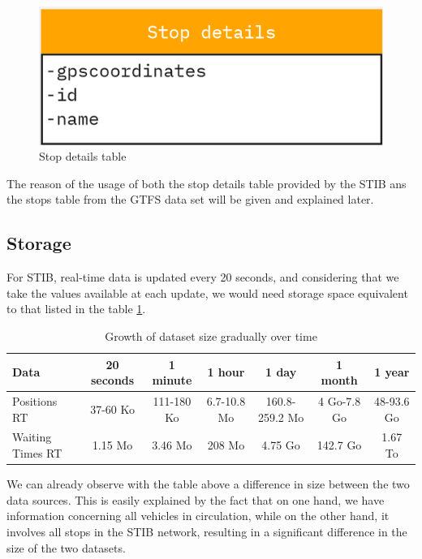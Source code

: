 \documentclass[12pt]{report}
\begin{document}
	\begin{center}
		\begin{figure}
			\centering
			\includegraphics{images/stopDetailsTable.png}
			\caption{Stop details table}
			\label{stopDetailsTable}
		\end{figure}
	\end{center}
	
	The reason of the usage of both the stop details table provided by the STIB ans the stops table from the GTFS data set will be given and explained later. 
	
	\subsection{Storage}
	
	
	For STIB, real-time data is updated every 20 seconds, and considering that we take the values available at each update, we would need storage space equivalent to that listed in the table \ref{datasetsize}.
	
	
	\begin{table}
		\centering
		\begin{tabular}{|p{0.1\textheight}|c|c|c|c|c|c|}
			\hline
			Data & 20 seconds & 1 minute & 1 hour & 1 day & 1 month & 1 year \\
			\hline
			Positions RT & 37-60 Ko &  111-180 Ko & 6.7-10.8 Mo & 160.8-259.2 Mo & 4 Go-7.8 Go & 48-93.6 Go\\
			\hline
			Waiting Times RT & 1.15 Mo & 3.46 Mo & 208 Mo & 4.75 Go & 142.7 Go & 1.67 To \\
			\hline
			
		\end{tabular}
		\caption{Growth of dataset size gradually over time}
		\label{datasetsize}
	\end{table}
	
	
	
	We can already observe with the table above a difference in size between the two data sources. This is easily explained by the fact that on one hand, we have information concerning all vehicles in circulation, while on the other hand, it involves all stops in the STIB network, resulting in a significant difference in the size of the two datasets.
	
\end{document}
